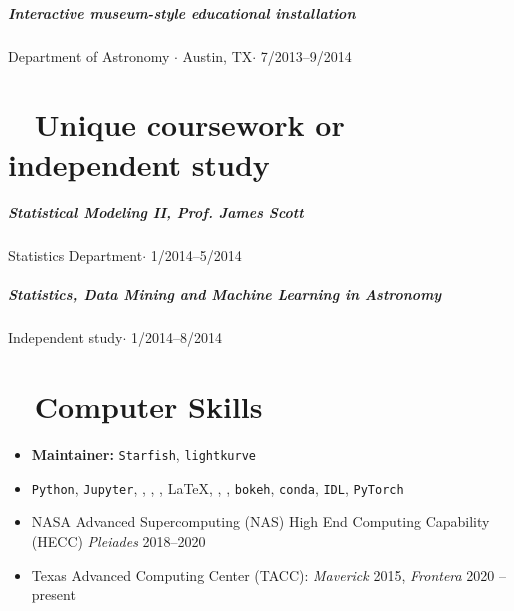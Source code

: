 \documentclass[10pt,letterpaper]{article}
\begin{document}
\subparagraph{Interactive museum-style educational installation}
Department of Astronomy $\cdot$ Austin, TX$\cdot$ 7/2013--9/2014

\section*{ \faSuperscript ~ Unique coursework or independent study}

\subparagraph{Statistical Modeling II, Prof. James Scott}
Statistics Department$\cdot$ 1/2014--5/2014

\subparagraph{Statistics, Data Mining and Machine Learning in Astronomy}
Independent study$\cdot$ 1/2014--8/2014

\section*{ \faLaptop ~ Computer Skills}

\begin{itemize}
    \item \textbf{Maintainer:} \texttt{Starfish}, \texttt{lightkurve}
    \item \texttt{Python}, \texttt{Jupyter}, \faTerminal, \faGit, \faGithub, \LaTeX, \faApple, \faLinux, \texttt{bokeh}, \texttt{conda}, \texttt{IDL}, \texttt{PyTorch}
    \item NASA Advanced Supercomputing (NAS) High End Computing Capability (HECC) \emph{Pleiades} 2018--2020
    \item Texas Advanced Computing Center (TACC): \emph{Maverick} 2015, \emph{Frontera} 2020 -- present
\end{itemize}




\end{document}

